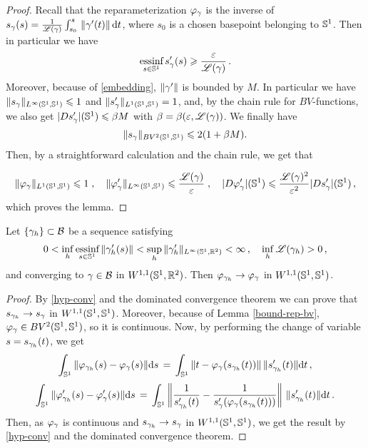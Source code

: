 \begin{proof}
Recall that the reparameterization $\varphi_\gamma$ is the inverse of  $s_\gamma(s) =\frac{1}{\mathscr{L}(\gamma)} \int_{s_0}^s \,\|\gamma'(t)\| \, \mathrm{d} t$,
where $s_0$ is a chosen basepoint belonging to $\mathbb{S}^1$. Then in particular we have  
$$ \underset{s\in \mathbb{S}^1}{\mbox{essinf}}\,s_\gamma'(s) \geqslant \frac{\varepsilon }{ \mathscr{L}(\gamma)} \,.$$ Moreover, because of \eqref{embedding}, $\| \gamma' \|$ is bounded by $M$. In particular we have $\| s_\gamma \|_{L^\infty(\mathbb{S}^1, \mathbb{S}^1)}\leqslant 1$ and $\| s_\gamma' \|_{L^1(\mathbb{S}^1, \mathbb{S}^1)}=1$, and, by the chain rule for $BV$-functions, we also get $|D s_\gamma'|(\mathbb{S}^1)\leqslant \beta M$ with $\beta=\beta(\varepsilon, \mathscr{L}(\gamma))$. 
We finally have
$$\| s_\gamma \|_{BV^2(\mathbb{S}^1, \mathbb{S}^1)}\leqslant 2(1+\beta M).$$
Then, by a straightforward calculation and the chain rule, we get that 

$$\| \varphi_\gamma \|_{L^1(\mathbb{S}^1, \mathbb{S}^1)}\leqslant 1 \;, \quad \| \varphi_\gamma' \|_{L^{\infty}(\mathbb{S}^1, \mathbb{S}^1)}\leqslant  \frac{\mathscr{L}(\gamma)}{\varepsilon} \;, \quad  |D\varphi_\gamma'|(\mathbb{S}^1)\leqslant \frac{\mathscr{L}(\gamma)^2}{\varepsilon^2}|Ds_\gamma'|(\mathbb{S}^1)\,,$$
which proves the lemma.
\end{proof}

\begin{lem}\label{conv-w11}
Let $\{\gamma_h\}\subset \mathcal{B}$ be a sequence satisfying  
\begin{equation}\label{hyp-conv}
0<\underset{h}{\inf}\,\underset{s\in \mathbb{S}^1}{\mbox{essinf}}\,\| \gamma_h'(s) \| < \underset{h}{\sup}\,\| \gamma_h' \|_{L^\infty(\mathbb{S}^1,{\mathbb R}^2)} < \infty \,,\quad \underset{h}{\inf}\,\mathscr{L}( \gamma_h) > 0\,,
\end{equation}
and  converging to $\gamma \in \mathcal{B}$ in $W^{1,1}(\mathbb{S}^1,\mathbb{R}^2)$. Then $\varphi_{\gamma_h}\rightarrow \varphi_{\gamma}$ in $W^{1,1}(\mathbb{S}^1, \mathbb{S}^1)$.
\end{lem}

\begin{proof}
By \eqref{hyp-conv} and the dominated convergence theorem we can prove that    $s_{\gamma_h}\rightarrow s_\gamma$ in $W^{1,1}(\mathbb{S}^1, \mathbb{S}^1)$.
Moreover, because of Lemma \ref{bound-rep-bv},  $\varphi_\gamma \in BV^2(\mathbb{S}^1, \mathbb{S}^1)$, so it is continuous. 
Now, by performing the change of variable $s= s_{\gamma_h}(t)$, we get 
$$\int_{\mathbb{S}^1} \|\varphi_{\gamma_{h}}(s)-\varphi_{\gamma}(s)\| \mathrm{d} s\,=\, \int_{\mathbb{S}^1} \|t-\varphi_{\gamma}(s_{\gamma_h}(t))\|\,\| s_{\gamma_h}'(t)\| \mathrm{d} t\,,$$
$$\int_{\mathbb{S}^1} \|\varphi_{\gamma_{h}}'(s)-\varphi_{\gamma}'(s)\| \mathrm{d} s\,=\, \int_{\mathbb{S}^1} \left\|\frac{1}{s_{\gamma_h}'(t)}-\frac{1}{s_\gamma'(\varphi_{\gamma}(s_{\gamma_h}(t)))}\right\|\,\| s_{\gamma_h}'(t)\| \mathrm{d} t\,.$$
Then, as $\varphi_\gamma$ is continuous and  $s_{\gamma_h}\rightarrow s_\gamma$ in $W^{1,1}(\mathbb{S}^1, \mathbb{S}^1)$, we get the result by \eqref{hyp-conv} and  the dominated convergence theorem. 
\end{proof}

